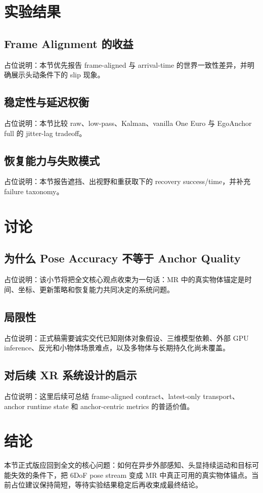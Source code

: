 \documentclass[review]{vgtc}
\begin{document}
\section{实验结果}

\subsection{Frame Alignment 的收益}
占位说明：本节优先报告 frame-aligned 与 arrival-time 的世界一致性差异，并明确展示头动条件下的 slip 现象。

\subsection{稳定性与延迟权衡}
占位说明：本节比较 raw、low-pass、Kalman、vanilla One Euro 与 EgoAnchor full 的 jitter-lag tradeoff。

\subsection{恢复能力与失败模式}
占位说明：本节报告遮挡、出视野和重获取下的 recovery success/time，并补充 failure taxonomy。

\section{讨论}

\subsection{为什么 Pose Accuracy 不等于 Anchor Quality}
占位说明：该小节将把全文核心观点收束为一句话：MR 中的真实物体锚定是时间、坐标、更新策略和恢复能力共同决定的系统问题。

\subsection{局限性}
占位说明：正式稿需要诚实交代已知刚体对象假设、三维模型依赖、外部 GPU inference、反光和小物体场景难点，以及多物体与长期持久化尚未覆盖。

\subsection{对后续 XR 系统设计的启示}
占位说明：这里后续可总结 frame-aligned contract、latest-only transport、anchor runtime state 和 anchor-centric metrics 的普适价值。

\section{结论}

本节正式版应回到全文的核心问题：如何在异步外部感知、头显持续运动和目标可能失效的条件下，把 6DoF pose stream 变成 MR 中真正可用的真实物体锚点。当前占位建议保持简短，等待实验结果稳定后再收束成最终结论。



\end{document}
